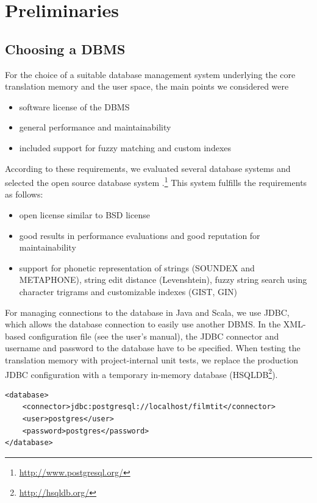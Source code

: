 \section{Preliminaries}

\subsection{Choosing a DBMS}
\label{sec:dbms}

For the choice of a suitable database management system underlying the
core translation memory and the user space, the main points we
considered were

\begin{itemize}
\item
  software license of the DBMS
\item
  general performance and maintainability
\item
  included support for fuzzy matching and custom indexes
\end{itemize}
According to these requirements, we evaluated several database systems
and selected the open source database system
\postgres.\footnote{\url{http://www.postgresql.org/}} This system
fulfills the requirements as follows:

\begin{itemize}
\item
  open license similar to BSD license
\item
  good results in performance evaluations and good reputation for
  maintainability
\item
  support for phonetic representation of strings (SOUNDEX and
  METAPHONE), string edit distance (Levenshtein), fuzzy string search
  using character trigrams and customizable indexes (GIST, GIN)
\end{itemize}

For managing connections to the database in Java and Scala, we use JDBC, 
which allows the database connection to easily use another DBMS. 
In the XML-based configuration file (see the user's manual), the JDBC connector
and username and password to the database have to be specified. When testing the
translation memory with project-internal unit tests, we replace the production JDBC
configuration with a temporary in-memory database (HSQLDB\footnote{\url{http://hsqldb.org/}}).

\begin{lstlisting}
<database>
    <connector>jdbc:postgresql://localhost/filmtit</connector>
    <user>postgres</user>
    <password>postgres</password>
</database>
\end{lstlisting}


